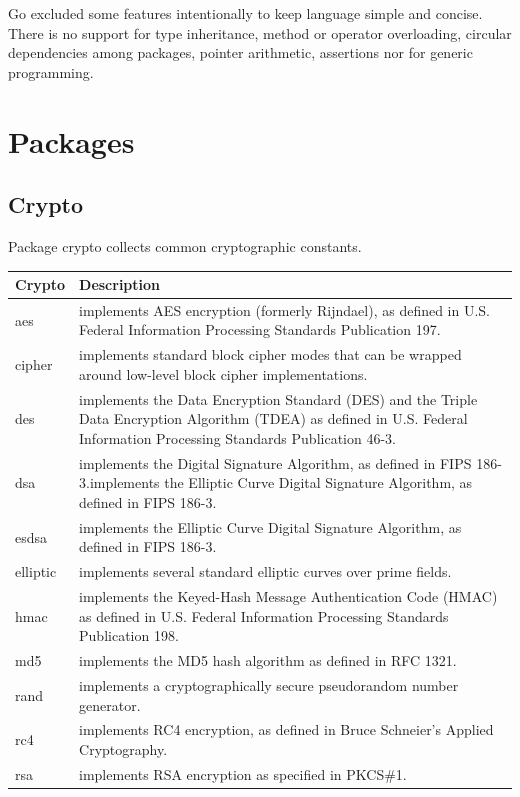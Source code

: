 \documentclass[
  digital, %
  notable,   %
  lof,     %
  lot,     %
]{fithesis3}
\begin{document}
Go excluded some features intentionally to keep language simple and concise. There is no 
support for type inheritance, method or operator overloading, circular dependencies among 
packages, pointer arithmetic, assertions nor for generic programming.

\section{Packages}

\subsection{Crypto}
Package crypto collects common cryptographic constants.

\begin{table}[th]
\begin{tabular}{|p{1.5cm} p{10.5cm}|}
\hline
Crypto & Description \\
\hline
aes & implements AES encryption (formerly Rijndael), as defined in U.S. Federal Information Processing Standards Publication 197. \\
cipher & implements standard block cipher modes that can be wrapped around low-level block cipher implementations. \\
des &  implements the Data Encryption Standard (DES) and the Triple Data Encryption Algorithm (TDEA) as defined in U.S. Federal Information Processing Standards Publication 46-3. \\
dsa &  implements the Digital Signature Algorithm, as defined in FIPS 186-3.implements the Elliptic Curve Digital Signature Algorithm, as defined in FIPS 186-3.\\
esdsa & implements the Elliptic Curve Digital Signature Algorithm, as defined in FIPS 186-3. \\
elliptic &  implements several standard elliptic curves over prime fields. \\
hmac & implements the Keyed-Hash Message Authentication Code (HMAC) as defined in U.S. Federal Information Processing Standards Publication 198. \\
md5 & implements the MD5 hash algorithm as defined in RFC 1321. \\
rand & implements a cryptographically secure pseudorandom number generator.\\
rc4 &  implements RC4 encryption, as defined in Bruce Schneier's Applied Cryptography.\\
rsa & implements RSA encryption as specified in PKCS\#1. \\

\end{tabular}
\end{table}
\end{document}
